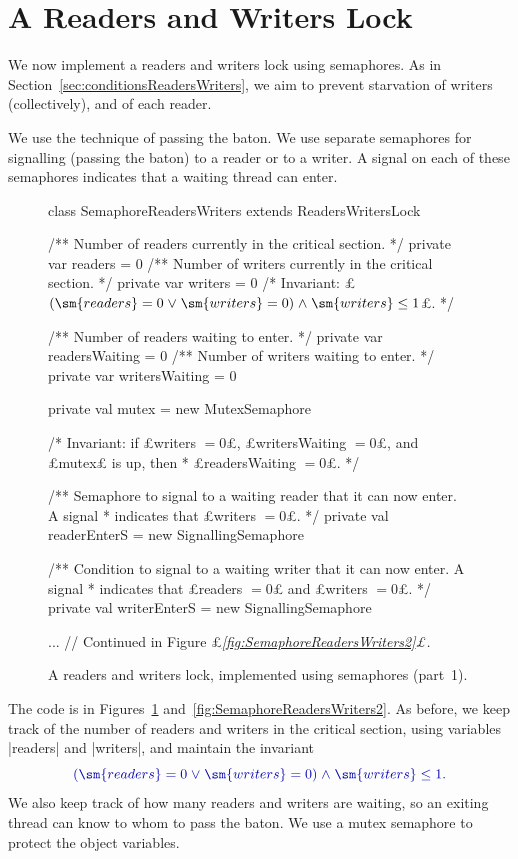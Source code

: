 \section{A Readers and Writers Lock}
\label{sec:semaphoresReadersWriters}

We now implement a readers and writers lock using semaphores.  As in
Section~\ref{sec:conditionsReadersWriters}, we aim to prevent starvation of
writers (collectively), and of each reader.

We use the technique of passing the baton.  We use separate semaphores for
signalling (passing the baton) to a reader or to a writer.  A signal on each
of these semaphores indicates that a waiting thread can enter.



\begin{figure}
\begin{scala}
class SemaphoreReadersWriters extends ReadersWritersLock{
  /** Number of readers currently in the critical section. */
  private var readers = 0
  /** Number of writers currently in the critical section. */
  private var writers = 0
  /* Invariant: £$(\sm{readers} = 0 \lor \sm{writers} = 0) \land \sm{writers} \le 1$£. */

  /** Number of readers waiting to enter. */
  private var readersWaiting = 0
  /** Number of writers waiting to enter. */
  private var writersWaiting = 0

  private val mutex = new MutexSemaphore

  /* Invariant: if £writers $= 0$£, £writersWaiting $= 0$£, and £mutex£ is up, then
   * £readersWaiting $= 0$£. */

  /** Semaphore to signal to a waiting reader that it can now enter.  A signal
    * indicates that £writers $= 0$£. */
  private val readerEnterS = new SignallingSemaphore

  /** Condition to signal to a waiting writer that it can now enter.  A signal
    * indicates that £readers $= 0$£ and £writers $= 0$£. */ 
  private val writerEnterS = new SignallingSemaphore

  ... // Continued in Figure £\sl\ref{fig:SemaphoreReadersWriters2}£.
}
\end{scala}
\caption{A readers and writers lock, implemented using semaphores (part~1).}
\label{fig:SemaphoreReadersWriters1}
\end{figure}



The code is in Figures~\ref{fig:SemaphoreReadersWriters1}
and~\ref{fig:SemaphoreReadersWriters2}.  As before, we keep track of the
number of readers and writers in the critical section, using variables
|readers| and |writers|, and maintain the invariant 
\[\mstyle
(\sm{readers} = 0 \lor \sm{writers} = 0) \land \sm{writers} \le 1.
\]
We also keep track of how many readers and writers are waiting, so an
exiting thread can know to whom to pass the baton.  We use a mutex semaphore
to protect the object variables.


